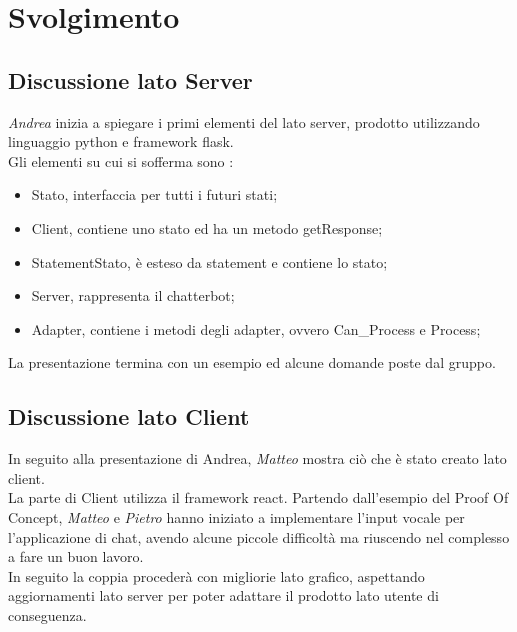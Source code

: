 \section{Svolgimento}
\subsection{Discussione lato Server}
\textit{Andrea} inizia a spiegare i primi elementi del lato server, prodotto utilizzando linguaggio python e framework flask.\\
Gli elementi su cui si sofferma sono : 
\begin{itemize}
  \item Stato, interfaccia per tutti i futuri stati;
  \item Client, contiene uno stato ed ha un metodo getResponse;
  \item StatementStato, è esteso da statement e contiene lo stato;
  \item Server, rappresenta il chatterbot;
  \item Adapter, contiene i metodi degli adapter, ovvero Can\_Process e Process;
\end{itemize}
La presentazione termina con un esempio ed alcune domande poste dal gruppo.

\subsection{Discussione lato Client}
In seguito alla presentazione di Andrea, \textit{Matteo} mostra ciò che è stato creato lato client. \\
La parte di Client utilizza il framework react. Partendo dall'esempio del Proof Of Concept, \textit{Matteo} e \textit{Pietro}
hanno iniziato a implementare l'input vocale per l'applicazione di chat, avendo alcune piccole difficoltà ma riuscendo nel complesso a fare un buon lavoro. \\
In seguito la coppia procederà con migliorie lato grafico, aspettando aggiornamenti lato server per poter adattare il prodotto lato utente di conseguenza.

